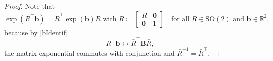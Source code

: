 \documentclass[a4paper,11pt]{scrartcl}
\numberwithin{dummy}{section}
\theoremstyle{plain}
\theoremstyle{plain}
\theoremstyle{plain}
\theoremstyle{plain}
\theoremstyle{nonumberplain}
\newtheorem{proof}{Proof}
\newcommand{\F}[1][R]{\mathbb{#1}} %
\newcommand{\SO}{\mathrm{SO}}
\begin{document}
	\begin{proof}
		Note that 
		\begin{equation}
		\label{AdjointCumm}
		\exp (R^{\top} \mathbf{b}) 
		= \bar{R}^{\top} \exp (\mathbf{b})
		\bar{R}
		\mbox{ with }
		\bar{R}
		\coloneqq \left[\begin{matrix}
		R & \mathbf{0} \\
		\mathbf{0} & 1
		\end{matrix}\right]
		\quad\mbox{for all } R \in \SO(2) \mbox{ and } \mathbf{b} \in \F^{2},
		\end{equation}
		because by \eqref{bIdentif}
		\begin{equation*}
		R^{\top} \mathbf{b} 
		\leftrightarrow
		\bar{R}^{\top} \mathbf{B} \bar{R},
		\end{equation*}
		the matrix exponential commutes with conjunction and $ \bar{R}^{-1} = \bar{R}^{\top} $.
		

\end{proof}
\end{document}
